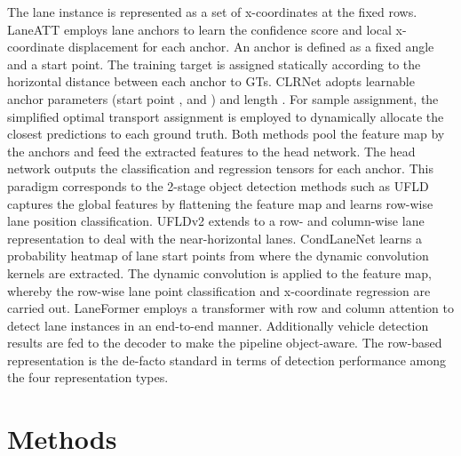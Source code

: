 \documentclass[10pt,twocolumn,letterpaper]{article}
\begin{document}
 The lane instance is represented as a set of x-coordinates at the fixed rows. LaneATT \cite{tabelini2021cvpr} employs lane anchors to learn the confidence score and local x-coordinate displacement for each anchor. An anchor is defined as a fixed angle and a start point. The training target is assigned statically according to the horizontal distance between each anchor to GTs. CLRNet \cite{Zheng_2022_CVPR} adopts learnable anchor parameters (start point ,  and ) and length .  For sample assignment, the simplified optimal transport assignment \cite{YOLOX} is employed to dynamically allocate the closest predictions to each ground truth. 
Both methods pool the feature map by the anchors and feed the extracted features to the head network. The head network outputs the classification and regression tensors for each anchor. This paradigm corresponds to the 2-stage object detection methods such as \cite{fpn, maskrcnn}
UFLD \cite{qin2020ultra} captures the global features by flattening the feature map and learns row-wise lane position classification. UFLDv2 \cite{qin2022ultrav2} extends \cite{qin2020ultra} to a row- and column-wise lane representation to deal with the near-horizontal lanes. 
CondLaneNet \cite{Liu_2021_ICCV} learns a probability heatmap of lane start points from where the dynamic convolution kernels are extracted. The dynamic convolution is applied to the feature map, whereby the row-wise lane point classification and x-coordinate regression are carried out.
LaneFormer \cite{laneformer2022} employs a transformer with row and column attention to detect lane instances in an end-to-end manner. Additionally vehicle detection results are fed to the decoder to make the pipeline object-aware. The row-based representation is the de-facto standard in terms of detection performance among the four representation types. 

\section{Methods}
\end{document}
